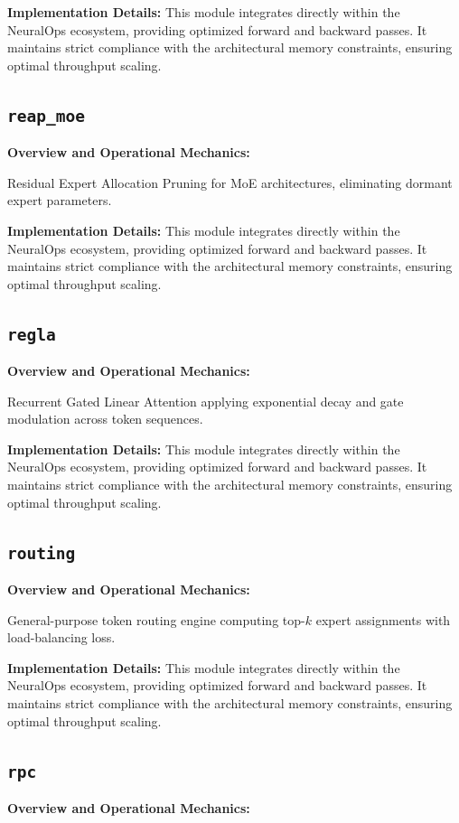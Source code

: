 \documentclass[10pt,twocolumn,letterpaper]{article}
\begin{document}
\textbf{Implementation Details:}
This module integrates directly within the NeuralOps ecosystem, providing optimized forward and backward passes. It maintains strict compliance with the architectural memory constraints, ensuring optimal throughput scaling.

\subsection{\texttt{reap\_moe}}
\textbf{Overview and Operational Mechanics:}

Residual Expert Allocation Pruning for MoE architectures, eliminating dormant expert parameters.

\textbf{Implementation Details:}
This module integrates directly within the NeuralOps ecosystem, providing optimized forward and backward passes. It maintains strict compliance with the architectural memory constraints, ensuring optimal throughput scaling.

\subsection{\texttt{regla}}
\textbf{Overview and Operational Mechanics:}

Recurrent Gated Linear Attention applying exponential decay and gate modulation across token sequences.

\textbf{Implementation Details:}
This module integrates directly within the NeuralOps ecosystem, providing optimized forward and backward passes. It maintains strict compliance with the architectural memory constraints, ensuring optimal throughput scaling.

\subsection{\texttt{routing}}
\textbf{Overview and Operational Mechanics:}

General-purpose token routing engine computing top-$k$ expert assignments with load-balancing loss.

\textbf{Implementation Details:}
This module integrates directly within the NeuralOps ecosystem, providing optimized forward and backward passes. It maintains strict compliance with the architectural memory constraints, ensuring optimal throughput scaling.

\subsection{\texttt{rpc}}
\textbf{Overview and Operational Mechanics:}
\end{document}

